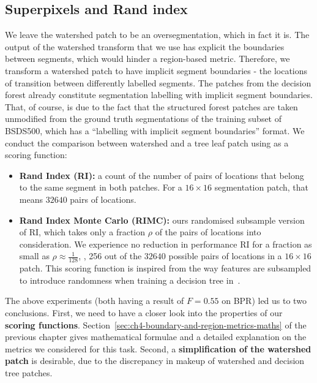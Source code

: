 \subsection{Superpixels and Rand index}
We leave the watershed patch to be an oversegmentation, which in fact it is. The output of the watershed transform that we use has explicit the boundaries between segments, which would hinder a region-based metric. Therefore, we transform a watershed patch to have implicit segment boundaries - the locations of transition between differently labelled segments. 
The patches from the decision forest already constitute segmentation labelling with implicit segment boundaries. That, of course, is due to the fact that the structured forest patches are taken unmodified from the ground truth segmentations of the training subset of BSDS500, which has a ``labelling with implicit segment boundaries'' format. We conduct the comparison between watershed and a tree leaf patch using as a scoring function:

\begin{itemize}
 \item{\bf Rand Index (RI):} a count of the number of pairs of locations that belong to the same segment in both patches. For a $16\times16$ segmentation patch, that means $32 640$ pairs of locations.
 \item{\bf Rand Index Monte Carlo (RIMC):} ours randomised subsample version of RI, which takes only a fraction $\rho$ of the pairs of locations into consideration. We experience no reduction in performance \wrt RI for a fraction as small as $\rho\approx\frac{1}{128}$, \ie, 256 out of the $32 640$ possible pairs of locations in a $16 \times 16$ patch. This scoring function is inspired from the way features are subsampled to introduce randomness when training a decision tree in~\cite{DollarICCV13edges,Dollar2013toolbox}.
\end{itemize}

The above experiments (both having a result of $F=0.55$ on BPR) led us to two conclusions. First, we need to have a closer look into the properties of our \textbf{scoring functions}. Section~\ref{sec:ch4-boundary-and-region-metrics-maths} of the previous chapter gives mathematical formulae and a detailed explanation on the metrics we considered for this task. Second, a \textbf{simplification of the watershed patch} is desirable, due to the discrepancy %
in makeup %
of watershed and decision tree patches.


